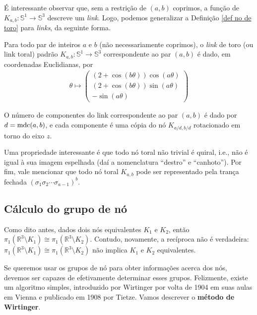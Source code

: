 	\par\vspace{0.3cm} É interessante observar que, sem a restrição de $(a,b)$ coprimos, a função de $K_{a,b}:\mathbb{S}^1\to\mathbb{S}^3$ descreve um \textit{link}. Logo, podemos generalizar a Definição \eqref{def no de toro} para \textit{links}, da seguinte forma.
	\begin{deff}
		\label{def link de toro}
		Para todo par de inteiros $a$ e $b$ (não necessariamente coprimos), o \textit{link} de toro (ou link toral) padrão $K_{a,b}: \mathbb{S}^1\to\mathbb{S}^3$ correspondente ao par $(a,b)$ é dado, em coordenadas Euclidianas, por 
		\begin{align*}
		\theta\mapsto
		\left( 
		\begin{matrix}
		(2+\cos(b\theta))\cos(a\theta) \\
		(2+\cos(b\theta))\sin(a\theta) \\
		-\sin(a\theta)
		\end{matrix} 
		\right)
		\end{align*}
		\par\vspace{0.3cm} O número de componentes do link correspondente ao par $(a,b)$ é dado por $d = \operatorname{mdc}(a,b)$, e cada componente é uma cópia do nó $\displaystyle{K_{a/d, b/d}}$ rotacionado em torno do eixo $z$.
	\end{deff}
	\par\vspace{0.3cm} Uma propriedade interessante é que todo nó toral não trivial é quiral, i.e., não é igual à sua imagem espelhada (daí a nomenclatura ``destro'' e ``canhoto''). Por fim, vale mencionar que todo nó toral $K_{a,b}$ pode ser representado pela trança fechada $(\sigma_1\sigma_2\cdots\sigma_{a-1})^b$.  
	
	\subsection{Cálculo do grupo de nó}
	\hspace{12pt} Como dito antes, dados dois nós equivalentes $K_1$ e $K_2$, então $\pi_1(\mathbb{R}^3\setminus K_1) \cong \pi_1(\mathbb{R}^3\setminus K_2)$. Contudo, novamente, a recíproca não é verdadeira: $\pi_1(\mathbb{R}^3\setminus K_1) \cong \pi_1(\mathbb{R}^3\setminus K_2)$ não implica $K_1$ e $K_2$ equivalentes. 
	\par\vspace{0.3cm} Se queremos usar os grupos de nó para obter informações acerca dos nós, devemos ser capazes de efetivamente determinar esses grupos. Felizmente, existe um algoritmo simples, introduzido por Wirtinger por volta de 1904 em suas aulas em Vienna e publicado em 1908 por Tietze. Vamos descrever o \textbf{método de Wirtinger}.
